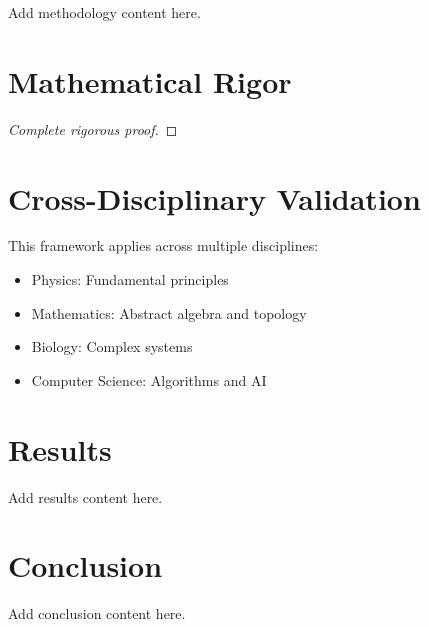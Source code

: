 \documentclass[11pt,a4paper]{article}
\begin{document}
Add methodology content here.



\section{Mathematical Rigor}

\begin{theorem}
\end{theorem}

\begin{proof}
[Complete rigorous proof]
\end{proof}


\section{Cross-Disciplinary Validation}

This framework applies across multiple disciplines:
\begin{itemize}
    \item Physics: Fundamental principles
    \item Mathematics: Abstract algebra and topology
    \item Biology: Complex systems
    \item Computer Science: Algorithms and AI
\end{itemize}

\section{Results}
\label{sec:results}

Add results content here.


\section{Conclusion}
\label{sec:conclusion}

Add conclusion content here.
\end{document}
